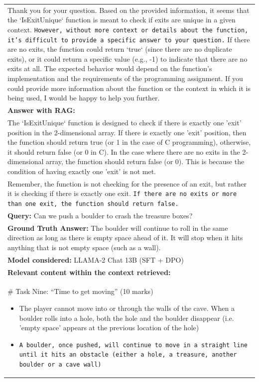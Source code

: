 \begin{table}[!htp]
\begin{tabular}{|p{\linewidth}|}
Thank you for your question. Based on the provided information, it seems that the `IsExitUnique` function is meant to check if exits are unique in a given context. \texttt{However, without more context or details about the function, it's difficult to provide a specific answer to your question.} If there are no exits, the function could return `true` (since there are no duplicate exits), or it could return a specific value (e.g., -1) to indicate that there are no exits at all. The expected behavior would depend on the function's implementation and the requirements of the programming assignment. If you could provide more information about the function or the context in which it is being used, I would be happy to help you further.
\\
\textbf{Answer with RAG:}\\
The `IsExitUnique` function is designed to check if there is exactly one 'exit' position in the 2-dimensional array. If there is exactly one 'exit' position, then the function should return true (or 1 in the case of C programming), otherwise, it should return false (or 0 in C). In the case where there are no exits in the 2-dimensional array, the function should return false (or 0). This is because the condition of having exactly one 'exit' is not met. \\
Remember, the function is not checking for the presence of an exit, but rather it is checking if there is exactly one exit. \texttt{If there are no exits or more than one exit, the function should return false.}\\
\hline
\textbf{Query:} Can we push a boulder to crash the treasure boxes?\\
\textbf{Ground Truth Answer:} The boulder will continue to roll in the same direction as long as there is empty space ahead of it.  It will stop when it hits anything that is not empty space (such as a wall). \\
\textbf{Model considered:} LLAMA-2 Chat 13B (SFT + DPO)\\
\textbf{Relevant content within the context retrieved:}\\
\# Task Nine: “Time to get moving” (10 marks)
\begin{itemize}
    \item The player cannot move into or through the walls of the cave. When a boulder rolls into a hole, both the hole and the boulder disappear (i.e. 'empty space' appears at the previous location of the hole)
    \item \texttt{A boulder, once pushed, will continue to move in a straight line until it hits an obstacle (either a hole, a treasure, another boulder or a cave wall)}

\end{itemize}
\end{tabular}
\end{table}
